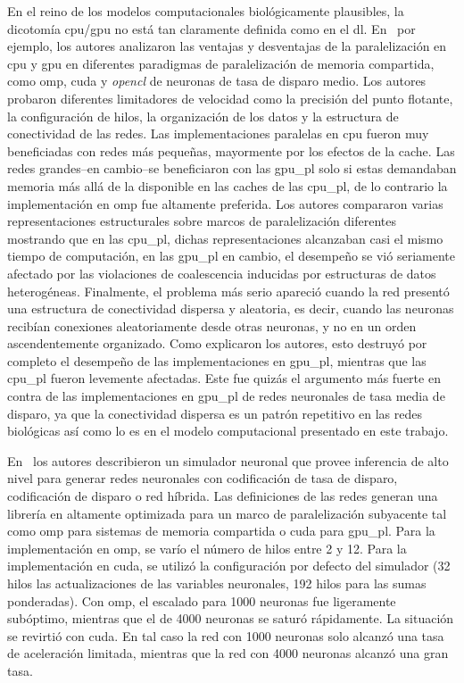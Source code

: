 {En el reino de los modelos computacionales biológicamente plausibles, la dicotomía \gls{cpu}/\gls{gpu} no está tan claramente definida como en el \gls{dl}.
En~\cite{doi:10.3109/0954898X.2012.739292} por ejemplo, los autores analizaron las ventajas y desventajas de la paralelización en \gls{cpu} y \gls{gpu} en diferentes paradigmas de paralelización de memoria compartida, como \gls{omp}, \gls{cuda} y \emph{\gls{opencl}} de neuronas de tasa de disparo medio.
Los autores probaron diferentes limitadores de velocidad como la precisión del punto flotante, la configuración de hilos, la organización de los datos y la estructura de conectividad de las redes.
Las implementaciones paralelas en \gls{cpu} fueron muy beneficiadas con redes más pequeñas, mayormente por los efectos de la cache.
Las redes grandes--en cambio--se beneficiaron con las \gls{gpu_pl} solo si estas demandaban memoria más allá de la disponible en las caches de las \gls{cpu_pl}, de lo contrario la implementación en \gls{omp} fue altamente preferida.
Los autores compararon varias representaciones estructurales sobre marcos de paralelización diferentes mostrando que en las \gls{cpu_pl}, dichas representaciones alcanzaban casi el mismo tiempo de computación, en las \gls{gpu_pl} en cambio, el desempeño se vió seriamente afectado por las violaciones de coalescencia inducidas por estructuras de datos heterogéneas.
Finalmente, el problema más serio apareció cuando la red presentó una estructura de conectividad dispersa y aleatoria, es decir, cuando las neuronas recibían conexiones aleatoriamente desde otras neuronas, y no en un orden ascendentemente organizado.
Como explicaron los autores, esto destruyó por completo el desempeño de las implementaciones en \gls{gpu_pl}, mientras que las \gls{cpu_pl} fueron levemente afectadas.
Este fue quizás el argumento más fuerte en contra de las implementaciones en \gls{gpu_pl} de redes neuronales de tasa media de disparo, ya que la conectividad dispersa es un patrón repetitivo en las redes biológicas así como lo es en el modelo computacional presentado en este trabajo.

En~\cite{10.3389/fninf.2015.00019} los autores describieron un simulador neuronal que provee inferencia de alto nivel para generar redes neuronales con codificación de tasa de disparo, codificación de disparo o red híbrida.
Las definiciones de las redes generan una librería en \CC altamente optimizada para un marco de paralelización subyacente tal como \gls{omp} para sistemas de memoria compartida o \gls{cuda} para \gls{gpu_pl}.
Para la implementación en \gls{omp}, se varío el número de hilos entre 2 y 12.
Para la implementación en \gls{cuda}, se utilizó la configuración por defecto del simulador (32 hilos las actualizaciones de las variables neuronales, 192 hilos para las sumas ponderadas).
Con \gls{omp}, el escalado para 1000 neuronas fue ligeramente subóptimo, mientras que el de 4000 neuronas se saturó rápidamente.
La situación se revirtió con \gls{cuda}.
En tal caso la red con 1000 neuronas solo alcanzó una tasa de aceleración limitada, mientras que la red con 4000 neuronas alcanzó una gran tasa.

}
